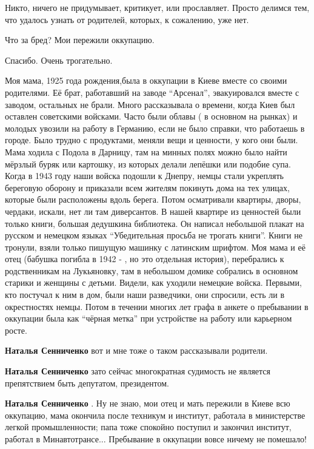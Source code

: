 \begin{itemize}
\begin{itemize}
Никто, ничего не придумывает, критикует, или прославляет. Просто делимся
тем, что удалось узнать от родителей, которых, к сожалению, уже нет.



Что за бред? Мои пережили оккупацию.

\end{itemize} %

Спасибо. Очень трогательно.


Моя мама, 1925 года рождения,была в оккупации в Киеве вместе со своими
родителями. Её брат, работавший на заводе \enquote{Арсенал}, эвакуировался вместе с
заводом, остальных не брали. Много рассказывала о времени, когда Киев был
оставлен советскими войсками. Часто были облавы ( в основном на рынках) и
молодых увозили на работу в Германию, если не было справки, что работаешь в
городе. Было трудно с продуктами, меняли вещи и ценности, у кого они были. Мама
ходила с Подола в Дарницу, там на минных полях можно было найти мёрзлый буряк
или картошку, из которых делали лепёшки или подобие супа. Когда в 1943 году
наши войска подошли к Днепру, немцы стали укреплять береговую оборону и
приказали всем жителям покинуть дома на тех улицах, которые были расположены
вдоль берега. Потом осматривали квартиры, дворы, чердаки, искали, нет ли там
диверсантов. В нашей квартире из ценностей были только книги, большая дедушкина
библиотека. Он написал небольшой плакат на русском и немецком языках
\enquote{Убедительная просьба не трогать книги}. Книги не тронули, взяли только пишущую
машинку с латинским шрифтом. Моя мама и её отец (бабушка погибла в 1942 - , но
это отдельная история), перебрались к родственникам на Лукьяновку, там в
небольшом домике собрались в основном старики и женщины с детьми. Видели, как
уходили немецкие войска. Первыми, кто постучал к ним в дом, были наши
разведчики, они спросили, есть ли в окрестностях немцы. Потом в течении многих
лет графа в анкете о пребывании в оккупации была как \enquote{чёрная метка} при
устройстве на работу или карьерном росте.

\begin{itemize} %
\textbf{Наталья Сенниченко} вот и мне тоже о таком рассказывали родители.

\textbf{Наталья Сенниченко} зато сейчас многократная судимость не является препятствием быть депутатом, президентом.

\textbf{Наталья Сенниченко} . Ну не знаю, мои отец и мать пережили в Киеве всю оккупацию, мама окончила после техникум и институт, работала в министерстве легкой промышленности; папа тоже спокойно поступил и закончил институт, работал в Минавтотрансе... Пребывание в оккупации вовсе ничему не помешало!


\end{itemize}
\end{itemize}
